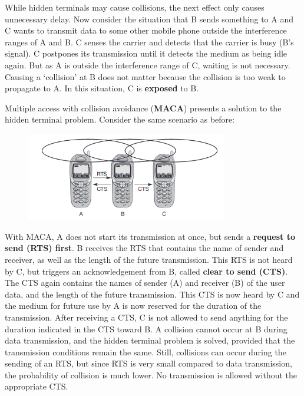 \documentclass[12pt]{article}
\begin{document}
While hidden terminals may cause collisions, the next effect only
causes unnecessary delay. Now consider the situation that B sends something to
A and C wants to transmit data to some other mobile phone outside the
interference ranges of A and B. C senses the carrier and detects that the
carrier is busy (B's signal). C postpones its transmission until it detects the
medium as being idle again. But as A is outside the interference range of C,
waiting is not necessary. Causing a `collision' at B does not matter because the
collision is too weak to propagate to A. In this situation, C is
\textbf{exposed} to B.

Multiple access with collision avoidance (\textbf{MACA}) presents a solution to
the hidden terminal problem. Consider the same scenario as before:
\begin{figure}[H]
    \centering
    \includegraphics[width=250pt]{hidden_terminal_soln.png}
\end{figure}
With MACA, A does not start its transmission at once, but sends
a \textbf{request to send (RTS) first}. B receives the RTS that contains the
name of sender and receiver, as well as the length of the future transmission.
This RTS is not heard by C, but triggers an acknowledgement from B, called
\textbf{clear to send (CTS)}. The CTS again contains the names of sender (A)
and receiver (B) of the user data, and the length of the future transmission.
This CTS is now heard by C and the medium for future use by A is now reserved
for the duration of the transmission. After receiving a CTS, C is not allowed
to send anything for the duration indicated in the CTS toward B. A collision
cannot occur at B during data transmission, and the hidden terminal
problem is solved, provided that the transmission conditions remain the
same. Still, collisions can occur during the sending of an RTS, but since 
RTS is very small compared to data transmission, the probability of collision
is much lower. No transmission is allowed without the appropriate CTS.
\end{document}

